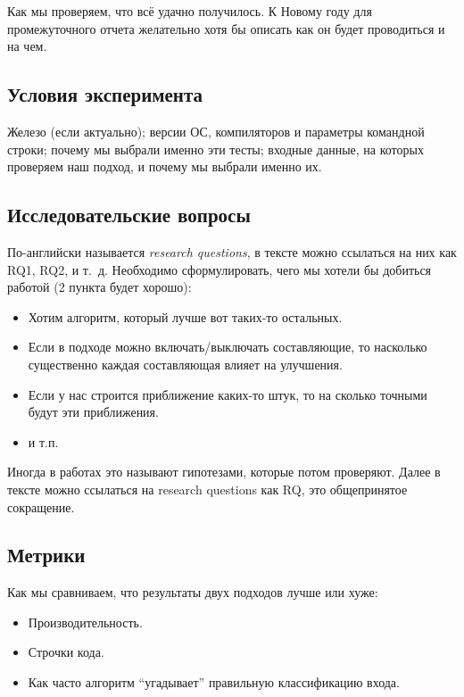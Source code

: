 
Как мы проверяем, что  всё удачно получилось.  К Новому году для промежуточного отчета желательно хотя бы описать как он будет прово\-диться и на чем.

\subsection{Условия эксперимента}
Железо (если актуально);  версии ОС, компиляторов и параметры командной строки; почему мы выбрали именно эти тесты; входные дан\-ные, на которых проверяем наш подход, и почему мы выбрали именно их.

\subsection{Исследовательские вопросы }
По-английски называется \emph{research questions}, в тексте можно ссылаться на них как RQ1, RQ2, и т.~д.
Необходимо сформулировать, чего мы хотели бы добиться работой (2 пункта будет хорошо):

\begin{itemize}
\item Хотим алгоритм, который лучше вот таких-то остальных.
\item Если в подходе можно включать/выключать составляющие, то насколько существенно каждая составляющая влияет на улучшения.
\item Если у нас строится приближение каких-то штук, то на сколько точными будут эти приближения.
\item и т.п.
\end{itemize}

Иногда в работах это называют гипотезами, которые потом проверяют. Далее в тексте можно ссылаться на research questions как \textsc{RQ}, это обще\-при\-нятое сокращение.

\subsection{Метрики}

Как мы сравниваем, что результаты двух подходов лучше или хуже:
\begin{itemize}
\item Производительность.
\item Строчки кода.
\item Как часто алгоритм ``угадывает'' правильную классификацию входа.
\end{itemize}

